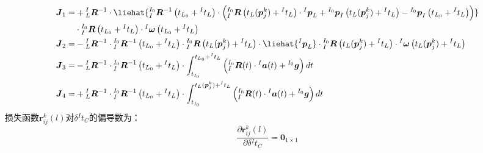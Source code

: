 \begin{equation*}
  \begin{aligned}
    \boldsymbol{J}_1= & +{{^{I}_{L}}\boldsymbol{R}^{-1}}\cdot\liehat{{{^{I_0}_{I}}\boldsymbol{R}^{-1}\left( t_{L_0}+{^{I}t_L}\right) }\cdot\left( {{^{I_0}_{I}}\boldsymbol{R}\left( t_{L}(\boldsymbol{p}_j^k)+{^{I}t_L}\right)}
    \cdot{^{I}\boldsymbol{p}_L}+{^{I_0}\boldsymbol{p}_I\left( t_{L}(\boldsymbol{p}_j^k)+{^{I}t_L}\right)}-{^{I_0}\boldsymbol{p}_I\left( t_{L_0}+{^{I}t_L}\right)}\right) }
    \\
                      & \cdot{{^{I_0}_{I}}\boldsymbol{R}\left( t_{L_0}+{^{I}t_L}\right) }
    \cdot{^{I}\boldsymbol{\omega}}\left( t_{L_0}+{^{I}t_L}\right)
    \\
    \boldsymbol{J}_2= & -
    {{^{I}_{L}}\boldsymbol{R}^{-1}}\cdot{{^{I_0}_{I}}\boldsymbol{R}^{-1}\left( t_{L_0}+{^{I}t_L}\right) }\cdot{{^{I_0}_{I}}\boldsymbol{R}\left( t_{L}(\boldsymbol{p}_j^k)+{^{I}t_L}\right) }
    \cdot\liehat{{^{I}\boldsymbol{p}_L}}
    \cdot{{^{I_0}_{I}}\boldsymbol{R}\left( t_{L}(\boldsymbol{p}_j^k)+{^{I}t_L}\right) }
    \cdot{^{I}\boldsymbol{\omega}}\left( t_{L}(\boldsymbol{p}_j^k)+{^{I}t_L}\right)
    \\
    \boldsymbol{J}_3= & -{{^{I}_{L}}\boldsymbol{R}^{-1}}
    \cdot{{^{I_0}_{I}}\boldsymbol{R}^{-1}\left( t_{L_0}+{^{I}t_L}\right) }
    \cdot
    \int_{t_{I_0}}^{t_{L_0}+{^{I}t_L}}\left( {^{I_0}_{I}\boldsymbol{R}}(t)\cdot{^{I}\boldsymbol{a}}(t)+{^{I_0}\boldsymbol{g}}\right)dt
    \\
    \boldsymbol{J}_4= & +
    {{^{I}_{L}}\boldsymbol{R}^{-1}}\cdot{{^{I_0}_{I}}\boldsymbol{R}^{-1}\left( t_{L_0}+{^{I}t_L}\right) }
    \cdot
    \int_{t_{I_0}}^{t_{L}(\boldsymbol{p}_j^k)+{^{I}t_L}}\left( {^{I_0}_{I}\boldsymbol{R}}(t)\cdot{^{I}\boldsymbol{a}}(t)+{^{I_0}\boldsymbol{g}}\right)dt
  \end{aligned}
\end{equation*}
损失函数$\boldsymbol{r}_{ij}^k(l)$对$\delta{^{I}t_{C}}$的偏导数为：
\begin{equation}
  \frac{\partial \boldsymbol{r}_{ij}^k(l)}{\partial \delta {^{I}t_{C}}}=\boldsymbol{0}_{1\times 1}
\end{equation}

